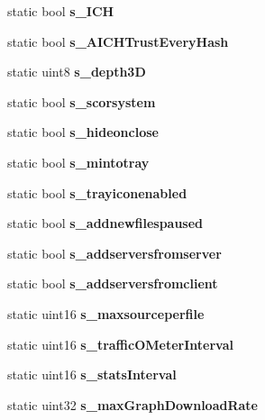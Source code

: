 \begin{DoxyCompactItemize}
\item 
static bool {\bfseries s\_\-ICH}\label{classCPreferences_ae7470513d7da009fb449f437d6ebcbfe}

\item 
static bool {\bfseries s\_\-AICHTrustEveryHash}\label{classCPreferences_a8c20813a9bd590bd998657fffdb1fc67}

\item 
static uint8 {\bfseries s\_\-depth3D}\label{classCPreferences_abd56bf7690cfb317f7f1ee894f9d78bd}

\item 
static bool {\bfseries s\_\-scorsystem}\label{classCPreferences_a5e705127d90544453d89e18004cb15fc}

\item 
static bool {\bfseries s\_\-hideonclose}\label{classCPreferences_a3a2761bc1114766700289be98b95af4f}

\item 
static bool {\bfseries s\_\-mintotray}\label{classCPreferences_a8f7477ca70b74856d8d7e24ae4857754}

\item 
static bool {\bfseries s\_\-trayiconenabled}\label{classCPreferences_ac74294bd8e80c74ee479163f4ba07962}

\item 
static bool {\bfseries s\_\-addnewfilespaused}\label{classCPreferences_abbd423e50ffea2b74c8c13c4c4366f61}

\item 
static bool {\bfseries s\_\-addserversfromserver}\label{classCPreferences_aea1ec18cbdb32f5617d3c62f8380ad16}

\item 
static bool {\bfseries s\_\-addserversfromclient}\label{classCPreferences_ae48942b4dfe4186a4fbaaebf3c0b08f7}

\item 
static uint16 {\bfseries s\_\-maxsourceperfile}\label{classCPreferences_a2ce633539f021c9c7ac20cbcb9539b39}

\item 
static uint16 {\bfseries s\_\-trafficOMeterInterval}\label{classCPreferences_ac9e52903c11464c75cc16bb644e6b223}

\item 
static uint16 {\bfseries s\_\-statsInterval}\label{classCPreferences_a7cefe86622cc191ed465b1da7c40a348}

\item 
static uint32 {\bfseries s\_\-maxGraphDownloadRate}\label{classCPreferences_ac88fbe313564a8e36abdc57d9338de2d}


\end{DoxyCompactItemize}
